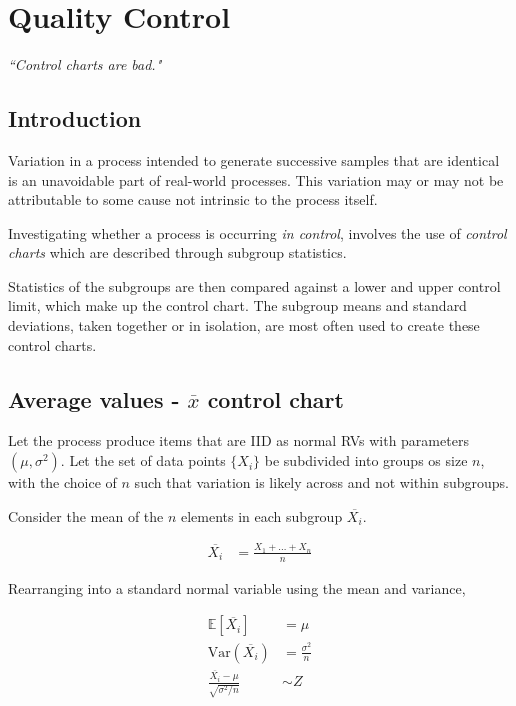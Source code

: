 \chapter{Quality Control}


\begin{flushright}
	\textit{``Control charts are bad."} 
\end{flushright}

\section{Introduction}

Variation in a process intended to generate successive samples that are identical is an unavoidable part of real-world processes. This variation may or may not be attributable to some cause not intrinsic to the process itself. 

Investigating whether a process is occurring \textit{in control}, involves the use of \textit{control charts} which are described through subgroup statistics.

Statistics of the subgroups are then compared against a lower and upper control limit, which make up the control chart. The subgroup means and standard deviations, taken together or in isolation, are most often used to create these control charts.

\section{Average values - $ \overline{x} $ control chart}

Let the process produce items that are IID as normal RVs with parameters $ (\mu, \sigma^2) $. Let the set of data points $ \{X_i\} $ be subdivided into groups os size $ n $, with the choice of $ n $ such that variation is likely across and not within subgroups.

Consider the mean of the $ n $ elements in each subgroup $ \overline{X_i} $.

\begin{align}
	\overline{X_i} &= \frac{X_1 + \dots + X_n}{n}
\end{align}

Rearranging into a standard normal variable using the mean and variance,

\begin{align}
	\mathbb{E}[\overline{X_i}] &= \mu \\
	\mathrm{Var}(\overline{X_i}) &= \frac{\sigma^2}{n} \\
	\frac{\overline{X_i} - \mu}{\sqrt{\sigma^2 / n}} &\sim Z
\end{align}

